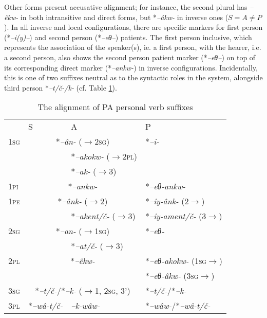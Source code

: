 \documentclass[twoside,a4paper,11pt]{article}
\newcommand{\ipa}[1]{{\phon\textit{#1}}}
\newcommand{\sg}{\textsc{sg}}
\newcommand{\pl}{\textsc{pl}}
\newcommand{\pli}{\textsc{pi}}
\newcommand{\pe}{\textsc{pe}}
\begin{document}
Other forms present accusative alignment; for instance, the second plural has \ipa{--êkw-} in both intransitive and direct forms, but *\ipa{--âkw-}  in inverse ones ($S = A \ne P$). In all inverse and local configurations, there are specific markers for first person (*\ipa{--i(y)--}) and second person (*\ipa{--eθ--}) patients. The first person inclusive, which represents the association of the speaker(s), ie. a first person, with the hearer, i.e. a second person, also shows the second person patient marker (*\ipa{--eθ--}) on top of its corresponding direct marker (*\ipa{--ankw-}) in inverse configurations. Incidentally, this is one of two suffixes neutral as to the syntactic roles in the system, alongside third person *\ipa{--t/č-/k-} (cf. Table \ref{tab:protoalg.align}).


\begin{table}[H]
\caption{The alignment of PA personal verb suffixes}
\centering \label{tab:protoalg.align}
\begin{tabular}{llll}
\toprule
& S & A & P\\
1\sg & \multicolumn{2}{c}{*\ipa{--ân-} ($\rightarrow$2\sg)}\hspace{1.5cm} & *\ipa{--i-}\\
 & & *\ipa{--akokw-} ($\rightarrow$2\pl) &\\
& & *\ipa{--ak-} ($\rightarrow$3) &\\
1\pli & \multicolumn{2}{c}{*\ipa{--ankw-}}\hspace{2.2cm} & *\ipa{--eθ-ankw-}\\
1\pe & \multicolumn{2}{c}{*\ipa{--ânk-}  ($\rightarrow$2)} \hspace{1.5cm} & *\ipa{--iy-ânk-} (2$\rightarrow$)\\
& & *\ipa{--akent/č-}  ($\rightarrow$3)& *\ipa{--iy-ament/č-} (3$\rightarrow$) \\
\midrule
2\sg & \multicolumn{2}{c}{*\ipa{--an-} ($\rightarrow$1\sg)}\hspace{1.5cm} & *\ipa{--eθ-}\\
&&*\ipa{--at/č-} ($\rightarrow$3) &\\
2\pl & \multicolumn{2}{c}{*\ipa{--êkw-}}\hspace{2.5cm} & *\ipa{--eθ-akokw-}  (1\sg$\rightarrow$) \\
& & & *\ipa{--eθ-âkw-}  (3\sg$\rightarrow$)\\
\midrule
3\sg & \multicolumn{2}{c}{*\ipa{--t/č-}/*\ipa{--k-} ($\rightarrow$1, 2\sg, 3')}\hspace{0.5cm} & *\ipa{--t/č-}/*\ipa{--k-}\\
3\pl & *\ipa{--wâ-t/č-} & \ipa{--k-wâw-} & *\ipa{--wâw-}/*\ipa{--wâ-t/č-}  \\
\bottomrule
\end{tabular}
\end{table}
\end{document}
